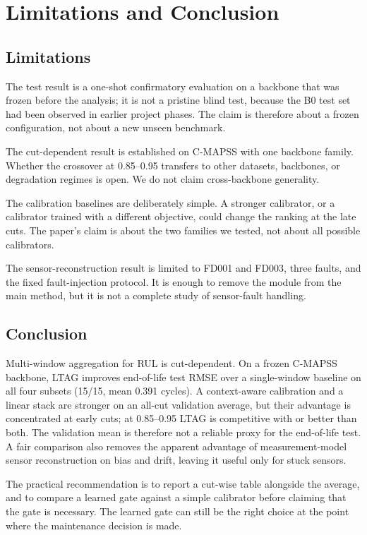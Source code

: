 \section{Limitations and Conclusion}
\label{sec:conclusion}

\subsection{Limitations}

The test result is a one-shot confirmatory evaluation on a backbone that was
frozen before the analysis; it is not a pristine blind test, because the B0 test
set had been observed in earlier project phases. The claim is therefore about a
frozen configuration, not about a new unseen benchmark.

The cut-dependent result is established on C-MAPSS with one backbone family.
Whether the crossover at 0.85--0.95 transfers to other datasets, backbones, or
degradation regimes is open. We do not claim cross-backbone generality.

The calibration baselines are deliberately simple. A stronger calibrator, or a
calibrator trained with a different objective, could change the ranking at the
late cuts. The paper's claim is about the two families we tested, not about all
possible calibrators.

The sensor-reconstruction result is limited to FD001 and FD003, three faults,
and the fixed fault-injection protocol. It is enough to remove the module from
the main method, but it is not a complete study of sensor-fault handling.

\subsection{Conclusion}

Multi-window aggregation for RUL is cut-dependent. On a frozen C-MAPSS backbone,
LTAG improves end-of-life test RMSE over a single-window baseline on all four
subsets (15/15, mean 0.391 cycles). A context-aware calibration and a linear
stack are stronger on an all-cut validation average, but their advantage is
concentrated at early cuts; at 0.85--0.95 LTAG is competitive with or better than
both. The validation mean is therefore not a reliable proxy for the end-of-life
test. A fair comparison also removes the apparent advantage of measurement-model
sensor reconstruction on bias and drift, leaving it useful only for stuck
sensors.

The practical recommendation is to report a cut-wise table alongside the
average, and to compare a learned gate against a simple calibrator before
claiming that the gate is necessary. The learned gate can still be the right
choice at the point where the maintenance decision is made.
